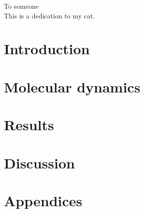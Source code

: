 \documentclass[twoside,english,a4paper]{uiofysmaster}
\begin{document}

\cleardoublepage

\begin{abstract}
\lipsum
\end{abstract}

\begin{dedication}
  To someone
  \\\vspace{12pt}
  This is a dedication to my cat.
\end{dedication}

\begin{acknowledgements}
  \lipsum
\end{acknowledgements}

\tableofcontents

\listoffigures
\listoftables
\listoflistings

\part{Introduction}
    

\part{Molecular dynamics}
    

\part{Results}
    

\part{Discussion}

\part{Appendices}
    
    
    

\printbibliography
% 
\end{document}
